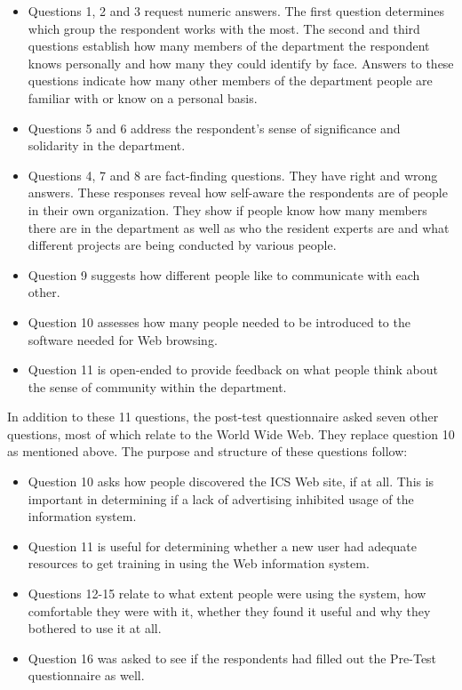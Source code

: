 \begin{itemize}
\item{Questions 1, 2 and 3 request numeric answers.  The first question
  determines which group the respondent works with the most.  The second and
  third questions establish how many members of the department the respondent
  knows personally and how many they could identify by face.  Answers to
  these questions indicate how many other members of the department people
  are familiar with or know on a personal basis.}
\item{Questions 5 and 6 address the respondent's sense of significance and
  solidarity in the department.}
\item{Questions 4, 7 and 8 are fact-finding questions.  They have right and
  wrong answers.  These responses reveal how self-aware the respondents are
  of people in their own organization.  They show if people know how many
  members there are in the department as well as who the resident experts are
  and what different projects are being conducted by various people.}
\item{Question 9 suggests how different people like to communicate with each
  other.}
\item{Question 10 assesses how many people needed to be introduced
  to the software needed for Web browsing.}
\item{Question 11 is open-ended to provide feedback on what people think about
  the sense of community within the department.}
\end{itemize}

In addition to these 11 questions, the post-test questionnaire asked seven
other questions, most of which relate to the World Wide Web.  They replace question
10 as mentioned above.  The purpose and structure of these questions follow:

\begin{itemize}
\item{Question 10 asks how people discovered the ICS Web site, if at all.  This
  is important in determining if a lack of advertising inhibited usage of the
  information system.}
\item{Question 11 is useful for determining whether a new user had adequate
  resources to get training in using the Web information system.}
\item{Questions 12-15 relate to what extent people were using the system, how
  comfortable they were with it, whether they found it useful and why they
  bothered to use it at all.}
\item{Question 16 was asked to see if the respondents had filled out the
  Pre-Test questionnaire as well.}
\end{itemize}

